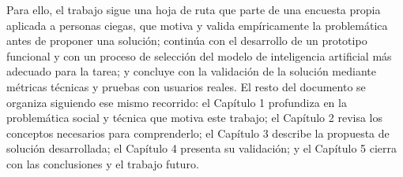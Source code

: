 Para ello, el trabajo sigue una hoja de ruta que parte de una encuesta propia aplicada a personas ciegas, que motiva y valida empíricamente la problemática antes de proponer una solución; continúa con el desarrollo de un prototipo funcional y con un proceso de selección del modelo de inteligencia artificial más adecuado para la tarea; y concluye con la validación de la solución mediante métricas técnicas y pruebas con usuarios reales. El resto del documento se organiza siguiendo ese mismo recorrido: el Capítulo 1 profundiza en la problemática social y técnica que motiva este trabajo; el Capítulo 2 revisa los conceptos necesarios para comprenderlo; el Capítulo 3 describe la propuesta de solución desarrollada; el Capítulo 4 presenta su validación; y el Capítulo 5 cierra con las conclusiones y el trabajo futuro.

